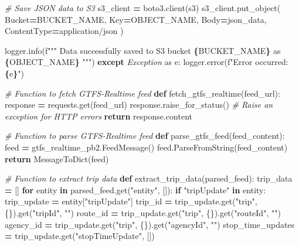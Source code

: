 \documentclass[
  12pt,
]{article}
\newenvironment{Shaded}{\begin{snugshade}}{\end{snugshade}}
\newcommand{\CommentTok}[1]{\textcolor[rgb]{0.56,0.35,0.01}{\textit{#1}}}
\newcommand{\ControlFlowTok}[1]{\textcolor[rgb]{0.13,0.29,0.53}{\textbf{#1}}}
\newcommand{\ImportTok}[1]{#1}
\newcommand{\KeywordTok}[1]{\textcolor[rgb]{0.13,0.29,0.53}{\textbf{#1}}}
\newcommand{\NormalTok}[1]{#1}
\newcommand{\OperatorTok}[1]{\textcolor[rgb]{0.81,0.36,0.00}{\textbf{#1}}}
\newcommand{\PreprocessorTok}[1]{\textcolor[rgb]{0.56,0.35,0.01}{\textit{#1}}}
\newcommand{\SpecialCharTok}[1]{\textcolor[rgb]{0.81,0.36,0.00}{\textbf{#1}}}
\newcommand{\SpecialStringTok}[1]{\textcolor[rgb]{0.31,0.60,0.02}{#1}}
\newcommand{\StringTok}[1]{\textcolor[rgb]{0.31,0.60,0.02}{#1}}
\begin{document}
\begin{Shaded}
\begin{Highlighting}[]
        \CommentTok{\# Save JSON data to S3}
\NormalTok{        s3\_client }\OperatorTok{=}\NormalTok{ boto3.client(}\StringTok{\textquotesingle{}s3\textquotesingle{}}\NormalTok{)}
\NormalTok{        s3\_client.put\_object(}
\NormalTok{            Bucket}\OperatorTok{=}\NormalTok{BUCKET\_NAME,}
\NormalTok{            Key}\OperatorTok{=}\NormalTok{OBJECT\_NAME,}
\NormalTok{            Body}\OperatorTok{=}\NormalTok{json\_data,}
\NormalTok{            ContentType}\OperatorTok{=}\StringTok{\textquotesingle{}application/json\textquotesingle{}}
\NormalTok{        )}
        
\NormalTok{        logger.info(}\SpecialStringTok{f"""}
\SpecialStringTok{        Data successfully saved to S3 bucket \textquotesingle{}}\SpecialCharTok{\{}\NormalTok{BUCKET\_NAME}\SpecialCharTok{\}}\SpecialStringTok{\textquotesingle{} as \textquotesingle{}}\SpecialCharTok{\{}\NormalTok{OBJECT\_NAME}\SpecialCharTok{\}}\SpecialStringTok{\textquotesingle{}}
\SpecialStringTok{        """}\NormalTok{)}
    \ControlFlowTok{except} \PreprocessorTok{Exception} \ImportTok{as}\NormalTok{ e:}
\NormalTok{        logger.error(}\SpecialStringTok{f"Error occurred: }\SpecialCharTok{\{}\NormalTok{e}\SpecialCharTok{\}}\SpecialStringTok{"}\NormalTok{)}

\CommentTok{\# Function to fetch GTFS{-}Realtime feed}
\KeywordTok{def}\NormalTok{ fetch\_gtfs\_realtime(feed\_url):}
\NormalTok{    response }\OperatorTok{=}\NormalTok{ requests.get(feed\_url)}
\NormalTok{    response.raise\_for\_status()  }\CommentTok{\# Raise an exception for HTTP errors}
    \ControlFlowTok{return}\NormalTok{ response.content}

\CommentTok{\# Function to parse GTFS{-}Realtime feed}
\KeywordTok{def}\NormalTok{ parse\_gtfs\_feed(feed\_content):}
\NormalTok{    feed }\OperatorTok{=}\NormalTok{ gtfs\_realtime\_pb2.FeedMessage()}
\NormalTok{    feed.ParseFromString(feed\_content)}
    \ControlFlowTok{return}\NormalTok{ MessageToDict(feed)}

\CommentTok{\# Function to extract trip data}
\KeywordTok{def}\NormalTok{ extract\_trip\_data(parsed\_feed):}
\NormalTok{    trip\_data }\OperatorTok{=}\NormalTok{ []}
    \ControlFlowTok{for}\NormalTok{ entity }\KeywordTok{in}\NormalTok{ parsed\_feed.get(}\StringTok{"entity"}\NormalTok{, []):}
        \ControlFlowTok{if} \StringTok{"tripUpdate"} \KeywordTok{in}\NormalTok{ entity:}
\NormalTok{            trip\_update }\OperatorTok{=}\NormalTok{ entity[}\StringTok{"tripUpdate"}\NormalTok{]}
\NormalTok{            trip\_id }\OperatorTok{=}\NormalTok{ trip\_update.get(}\StringTok{"trip"}\NormalTok{, \{\}).get(}\StringTok{"tripId"}\NormalTok{, }\StringTok{""}\NormalTok{)}
\NormalTok{            route\_id }\OperatorTok{=}\NormalTok{ trip\_update.get(}\StringTok{"trip"}\NormalTok{, \{\}).get(}\StringTok{"routeId"}\NormalTok{, }\StringTok{""}\NormalTok{)}
\NormalTok{            agency\_id }\OperatorTok{=}\NormalTok{ trip\_update.get(}\StringTok{"trip"}\NormalTok{, \{\}).get(}\StringTok{"agencyId"}\NormalTok{, }\StringTok{""}\NormalTok{)}
\NormalTok{            stop\_time\_updates }\OperatorTok{=}\NormalTok{ trip\_update.get(}\StringTok{"stopTimeUpdate"}\NormalTok{, [])}
            

\end{Highlighting}
\end{Shaded}
\end{document}
